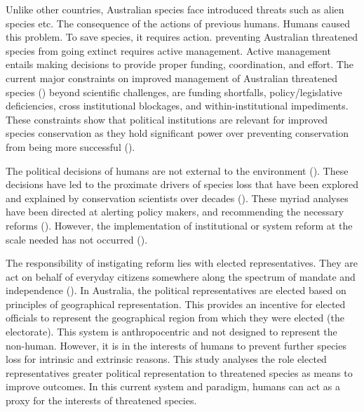 \documentclass[a4paper,11pt]{article}
\begin{document}
Unlike other countries, Australian species face introduced threats such as alien species etc. The consequence of the actions of previous humans.
Humans caused this problem.
To save species, it requires action.
preventing Australian threatened species from going extinct requires active management. Active management entails making decisions to provide proper funding, coordination, and effort. The current major constraints on improved management of Australian threatened species (\cite{leggeMonitoringThreatenedSpecies2018, wintleSpendingWhatWill2019, simmondsVulnerableSpeciesEcosystems2020,kearneyThreatsAustraliaImperilled2019,woinarskiReadingBlackBook2019,wardLotsLossLittle2019}) beyond scientific challenges, are funding shortfalls, policy/legislative deficiencies, cross institutional blockages, and within-institutional impediments. These constraints show that political institutions are relevant for improved species conservation as they hold significant power over preventing conservation from being more successful (\cite{rydenLinkingDemocracyBiodiversity2020}).

The political decisions of humans are not external to the environment (\cite{rydenLinkingDemocracyBiodiversity2020, dalbyAnthropoceneFormationsEnvironmental2017a,burkeSpeciesBordersPolitical2020}). These decisions have led to the proximate drivers of species loss that have been explored and explained by conservation scientists over decades (\cite{kearneyThreatsAustraliaImperilled2019,allekThreatsEndangeringAustralia2018}). These myriad analyses have been directed at alerting policy makers, and recommending the necessary reforms (\cite{hawkeReportIndependentReview2009,samuelIndependentReviewEPBC2020,mcdonaldImprovingPolicyEfficiency2015}). However, the implementation of institutional or system reform at the scale needed has not occurred (\cite{woinarskiContributionPolicyLaw2017,resideHowSendFinch2019}).

The responsibility of instigating reform lies with elected representatives. They are act on behalf of everyday citizens somewhere along the spectrum of mandate and independence (\cite{pitkinConceptRepresentation1972}). In Australia, the political representatives are elected based on principles of geographical representation. This provides an incentive for elected officials to represent the geographical region from which they were elected (the electorate). This system is anthropocentric and not designed to represent the non-human. However, it is in the interests of humans to prevent further species loss for intrinsic and extrinsic reasons. This study analyses the role elected representatives greater political representation to threatened species as means to improve outcomes. In this current system and paradigm, humans can act as a proxy for the interests of threatened species.
\end{document}
